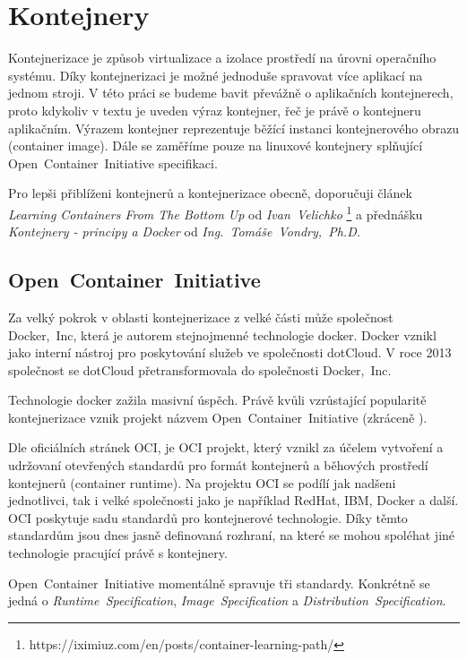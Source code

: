 \section{Kontejnery}
Kontejnerizace je způsob virtualizace a izolace prostředí na úrovni operačního systému. Díky kontejnerizaci je možné jednoduše spravovat více aplikací na jednom stroji. V této práci se budeme bavit převážně o aplikačních kontejnerech, proto kdykoliv v textu je uveden výraz kontejner, řeč je právě o kontejneru aplikačním. Výrazem kontejner reprezentuje běžící instanci kontejnerového obrazu (container image). Dále se zaměříme pouze na linuxové kontejnery splňující Open~Container~Initiative specifikaci.

Pro lepši přiblíženi kontejnerů a kontejnerizace obecně, doporučuji článek \textit{Learning Containers From The Bottom Up} od \textit{Ivan~Velichko} \footnote{https://iximiuz.com/en/posts/container-learning-path/} a přednášku \textit{Kontejnery - principy a Docker} od \textit{Ing.~Tomáše~Vondry,~Ph.D.}
\subsection{Open~Container~Initiative}
Za velký pokrok v oblasti kontejnerizace z velké části může společnost Docker,~Inc, která je autorem stejnojmenné technologie docker. Docker vznikl jako interní nástroj pro poskytování služeb ve společnosti dotCloud. V roce 2013 společnost se dotCloud přetransformovala do společnosti Docker,~Inc. \cite{poulton_2020_docker}

Technologie docker zažila masivní úspěch. Právě kvůli vzrůstající popularitě kontejnerizace vznik projekt názvem Open~Container~Initiative (zkráceně ).

Dle oficiálních stránek OCI, je OCI projekt, který vznikl za účelem vytvoření a udržovaní otevřených standardů pro formát kontejnerů a běhových prostředí kontejnerů (container runtime). Na projektu OCI se podílí jak nadšeni jednotlivci, tak i velké společnosti jako je například RedHat, IBM, Docker a další. OCI poskytuje sadu standardů pro kontejnerové technologie. Díky těmto standardům jsou dnes jasně definovaná rozhraní, na které se mohou spoléhat jiné technologie pracující právě s kontejnery.\cite{about}

Open~Container~Initiative momentálně spravuje tři standardy. Konkrétně se jedná o \textit{Runtime~Specification}, \textit{Image~Specification} a \textit{Distribution~Specification}.\cite{about}

